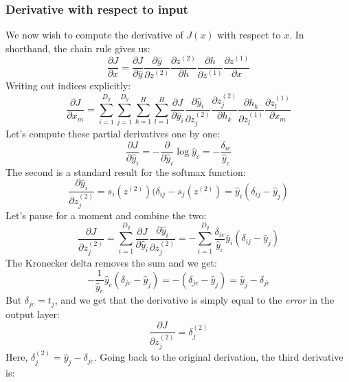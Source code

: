 \documentclass[12pt, a4paper]{article}
\numberwithin{equation}{section}
\begin{document}
\subsubsection{Derivative with respect to input}
We now wish to compute the derivative of $J(x)$ with respect to $x$. In shorthand, the chain rule gives us:
\begin{equation}
\frac{\partial J}{\partial x}=\frac{\partial J}{\partial\hat{y}}\frac{\partial \hat{y}}{\partial z^{(2)}}\frac{\partial z^{(2)}}{\partial h}\frac{\partial h}{\partial z^{(1)}}\frac{\partial z^{(1)}}{\partial x}
\end{equation}
Writing out indices explicitly:
\begin{equation}
\frac{\partial J}{\partial x_m}=\sum_{i=1}^{D_y}\sum_{j=1}^{D_y}\sum_{k=1}^H\sum_{l=1}^H\frac{\partial J}{\partial\hat{y}_i}\frac{\partial \hat{y}_i}{\partial z^{(2)}_j}\frac{\partial z^{(2)}_j}{\partial h_k}\frac{\partial h_k}{\partial z^{(1)}_l}\frac{\partial z^{(1)}_l}{\partial x_m}
\end{equation}
Let's compute these partial derivatives one by one:
\begin{equation}
\frac{\partial J}{\partial\hat{y}_i}=-\frac{\partial}{\partial\hat{y}_i}\log\hat{y}_c=-\frac{\delta_{ic}}{\hat{y}_c}
\end{equation}
The second is a standard result for the softmax function:
\begin{equation}
\frac{\partial \hat{y}_i}{\partial z^{(2)}_j}=s_i(z^{(2)})(\delta_{ij}-s_j(z^{(2)})=\hat{y}_i(\delta_{ij}-\hat{y}_j)
\end{equation}
Let's pause for a moment and combine the two:
\begin{equation}
\label{output_derivative}
\frac{\partial J}{\partial z^{(2)}_j}=\sum_{i=1}^{D_y}\frac{\partial J}{\partial\hat{y}_i}\frac{\partial \hat{y}_i}{\partial z^{(2)}_j}=-\sum_{i=1}^{D_y}\frac{\delta_{ic}}{\hat{y}_c}\hat{y}_i(\delta_{ij}-\hat{y}_j)
\end{equation}
The Kronecker delta removes the sum and we get:
\begin{equation}
-\frac{1}{\hat{y}_c}\hat{y}_c(\delta_{jc}-\hat{y}_j)=-(\delta_{jc}-\hat{y}_j)=\hat{y}_j-\delta_{jc}
\end{equation}
But $\delta_{jc}=t_j$, and we get that the derivative is simply equal to the \textit{error} in the output layer:
\begin{equation}
\label{ce_softmax}
\frac{\partial J}{\partial z^{(2)}_j}=\delta^{(2)}_j
\end{equation}
Here, $\delta^{(2)}_j=\hat{y}_j-\delta_{jc}$. Going back to the original derivation, the third derivative is:
\end{document}
